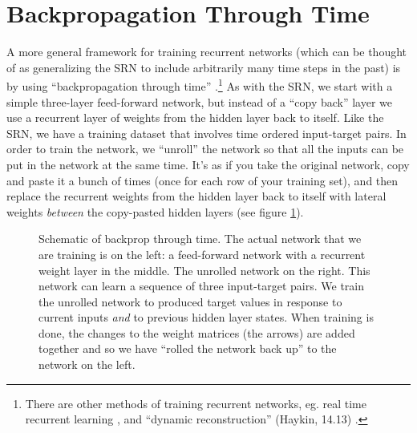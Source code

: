 
\section{Backpropagation  Through Time}


A more general framework for training recurrent networks (which can be thought of as generalizing the SRN to include arbitrarily many time steps in the past) is by using ``backpropagation through time'' \cite{werbos1990backpropagation}.\footnote{There are other methods of training recurrent networks, eg. real time recurrent learning \cite{williams1989learning}, and ``dynamic reconstruction'' (Haykin, 14.13) \cite{haykin1998neural}.} As with the SRN, we start with a simple three-layer feed-forward network, but instead of a ``copy back''  layer we use a recurrent layer of weights from the hidden layer back to itself. Like the SRN, we have a training dataset that involves time ordered input-target pairs. In order to train the network, we ``unroll'' the network so that all the inputs can be put in the network at the same time. It's as if you take the original network, copy and paste it a bunch of times (once for each row of your training set), and then replace the recurrent weights from the hidden layer back to itself with lateral weights \emph{between} the copy-pasted hidden layers (see figure \ref{bptt}). 

\begin{figure}[h]
\centering
{}
\caption[Jeff Yoshimi.]{Schematic of backprop through time. The actual network that we are training is on the left: a feed-forward network with a recurrent weight layer in the middle. The unrolled network on the right. This network can learn a sequence of three input-target pairs. We train the unrolled network to produced target values in response to current inputs \emph{and} to previous hidden layer states. When training is done, the changes to the weight matrices (the arrows) are added together and so we have ``rolled the network back up'' to the network on the left.}
\label{bptt}
\end{figure}


